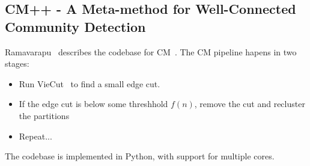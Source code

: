 \documentclass[../../main/main.tex]{subfiles}
\begin{document}
\subsection*{CM++ - A Meta-method for Well-Connected Community Detection}

Ramavarapu~\cite{ramavarapu24-01} describes the codebase for CM~\cite{park24-11}.
The CM pipeline hapens in two stages:
\begin{itemize}
    \item Run VieCut~\cite{henzinger18-10} to find a small edge cut.
	\item If the edge cut is below some threshhold $f(n)$, remove the cut and recluster the partitions
    \item Repeat...
\end{itemize}

The codebase is implemented in Python, with support for multiple cores.

\bibsub
\end{document}
